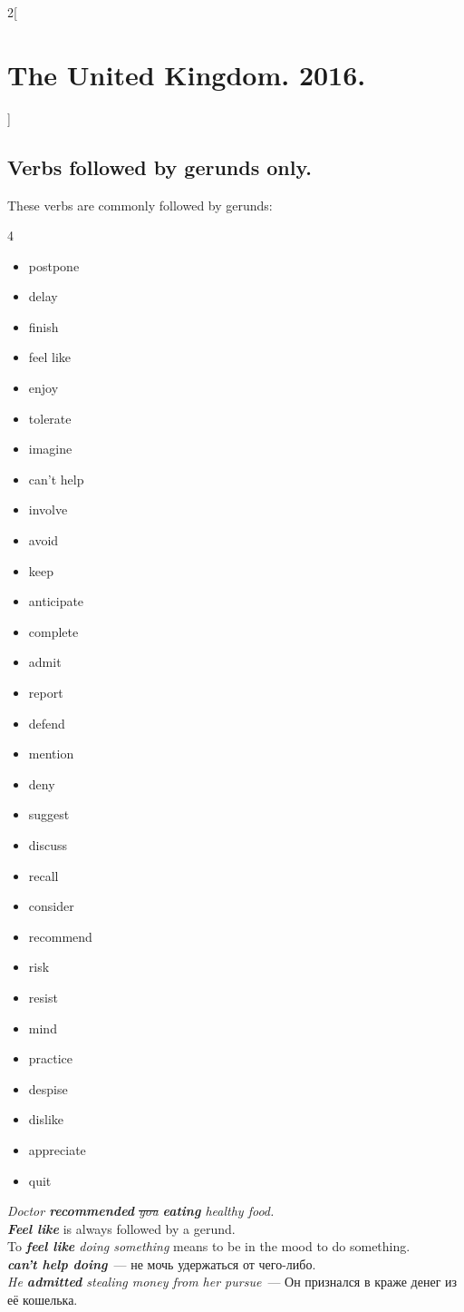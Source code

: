 \documentclass[10pt,a4paper]{article}
\newcommand\ex[1]{\textit{\textbf{{#1}}}}           %
\begin{document}
\begin{multicols}{2}[\section{The United Kingdom. 2016.}]
\subsection{Verbs followed by gerunds only.} \label{sed:Verbs_followed_by_gerunds}
These verbs are commonly followed by gerunds:
\vspace{-4\parskip}
\begin{multicols}{4}
\begin{itemize}[leftmargin=3.05mm]
  \item postpone
  \item delay
  \item finish
  \item feel like
  \item enjoy
  \item tolerate
  \item imagine
  \item can't help
  \item involve
  \item avoid
  \item keep
  \item anticipate
  \item complete
  \item admit
  \item report
  \item defend
  \item mention
  \item deny
  \item suggest
  \item discuss
  \item recall
  \item consider
  \item recommend
  \item risk
  \item resist
  \item mind
  \item practice
  \item despise
  \item dislike
  \item appreciate
  \item quit
\end{itemize}
\end{multicols}
\vspace{-5\parskip}
\textit{Doctor \ex{recommended} \sout{you} \ex{eating} healthy food.}\\
\ex{Feel like} is always followed by a gerund.\\
To \textit{\ex{feel like} doing something} means to be in the mood to do something.\\
\ex{can't help doing}~--- не мочь удержаться от чего-либо.\\
\textit{He \ex{admitted} stealing money from her pursue}~--- Он признался в краже денег из её кошелька.









\end{multicols}
\end{document}

